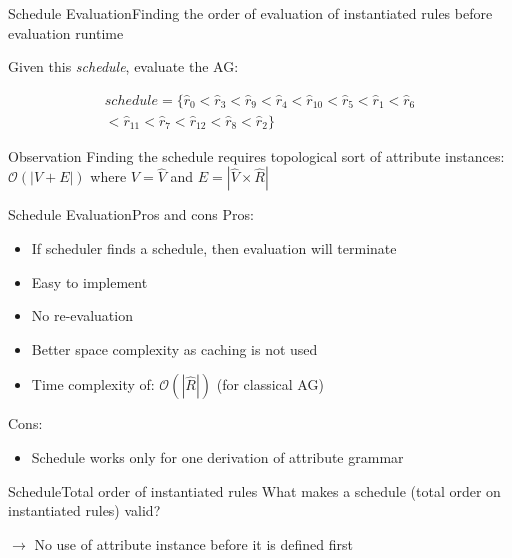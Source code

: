 \begin{frame}{Schedule Evaluation}{Finding the order of evaluation of instantiated rules before evaluation runtime}

Given this \emph{schedule}, evaluate the AG:

\begin{equation}
\begin{split}
\mathit{schedule} = \Big \{\hat{r}_0 < \hat{r}_3 < \hat{r}_9 < \hat{r}_4 < \hat{r}_{10} < \hat{r}_5 < \hat{r}_1 < \hat{r}_6 \\
< \hat{r}_{11} < \hat{r}_7 < \hat{r}_{12} < \hat{r}_8 < \hat{r}_2 \Big \}    
\end{split}
\end{equation}

\begin{alertblock}{Observation}
Finding the schedule requires topological sort of attribute instances: $\mathcal{O}(| V +  E|)$ where $V = \hat{V}$ and $E = |\hat{V}  \times  \hat{R}|$
\end{alertblock}
\end{frame}


\begin{frame}{Schedule Evaluation}{Pros and cons}
Pros:
\begin{itemize}
    \item If scheduler finds a schedule, then evaluation \alert{will terminate}
    \item Easy to implement
    \item \alert{No re-evaluation}
    \item Better space complexity as caching is not used
    \item Time complexity of: $\mathcal{O}(| \hat{R} |)$ (for classical AG)
\end{itemize}

Cons:
\begin{itemize}
    \item Schedule \alert{works only for one derivation} of attribute grammar
\end{itemize}
\end{frame}


\begin{frame}{Schedule}{Total order of instantiated rules}
What makes a schedule (total order on instantiated rules) valid?

\newlinevspace

$\to$ \alert{No use of attribute instance before it is defined first}

\end{frame}



